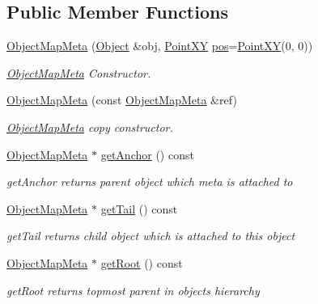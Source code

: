 \subsection*{Public Member Functions}
\begin{DoxyCompactItemize}
\item 
\hyperlink{classObjectMapMeta_a5217b0d2a08ec5ed88f790c9f75a0b75}{Object\+Map\+Meta} (\hyperlink{classObject}{Object} \&obj, \hyperlink{classPointXY}{Point\+X\+Y} \hyperlink{classObjectMapMeta_a7ca5609abb6c5fd57fe3828725240847}{pos}=\hyperlink{classPointXY}{Point\+X\+Y}(0, 0))
\begin{DoxyCompactList}\small\item\em \hyperlink{classObjectMapMeta}{Object\+Map\+Meta} Constructor. \end{DoxyCompactList}\item 
\hyperlink{classObjectMapMeta_a97778bafcdef8809112e315189371045}{Object\+Map\+Meta} (const \hyperlink{classObjectMapMeta}{Object\+Map\+Meta} \&ref)
\begin{DoxyCompactList}\small\item\em \hyperlink{classObjectMapMeta}{Object\+Map\+Meta} copy constructor. \end{DoxyCompactList}\item 
\hyperlink{classObjectMapMeta}{Object\+Map\+Meta} $\ast$ \hyperlink{classObjectMapMeta_a01202e363d84edbcb7b301c97400dd58}{get\+Anchor} () const 
\begin{DoxyCompactList}\small\item\em get\+Anchor returns parent object which meta is attached to \end{DoxyCompactList}\item 
\hyperlink{classObjectMapMeta}{Object\+Map\+Meta} $\ast$ \hyperlink{classObjectMapMeta_a50cb677227ba335c397b24bd170f032d}{get\+Tail} () const 
\begin{DoxyCompactList}\small\item\em get\+Tail returns child object which is attached to this object \end{DoxyCompactList}\item 
\hyperlink{classObjectMapMeta}{Object\+Map\+Meta} $\ast$ \hyperlink{classObjectMapMeta_ae8dd47a6811d0244dc3f10991a749569}{get\+Root} () const 
\begin{DoxyCompactList}\small\item\em get\+Root returns topmost parent in objects hierarchy \end{DoxyCompactList}\item 

\end{DoxyCompactItemize}
